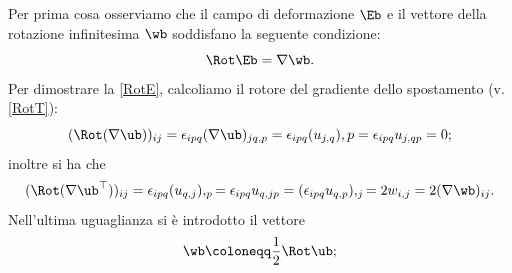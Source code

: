 Per prima cosa osserviamo che il campo di deformazione $\Eb$ e il vettore della rotazione infinitesima $\wb$ soddisfano la seguente condizione:
\begin{equation}\label{RotE}
	\Rot \Eb=\nabla \wb.
\end{equation}
Per dimostrare la \eqref{RotE}, calcoliamo il rotore del gradiente dello spostamento (v. \eqref{RotT}):
\begin{equation}
	(\Rot(\nabla\ub))_{ij}=\epsilon_{ipq}(\nabla\ub)_{jq,p}=\epsilon_{ipq}(u_{j,q}),p=\epsilon_{ipq}u_{j,qp}=0;
\end{equation}
inoltre si ha che 
\begin{equation}
	(\Rot(\nabla\ub^\top))_{ij}=\epsilon_{ipq}(u_{q,j}),_p=\epsilon_{ipq}u_{q,jp}=(\epsilon_{ipq}u_{q,p}),_j=2 w_{i,j}=2 (\nabla \wb)_{ij}.
\end{equation}
Nell'ultima uguaglianza si è introdotto il vettore
\begin{equation}
	\wb \coloneqq \frac12 \Rot \ub;
\end{equation}
